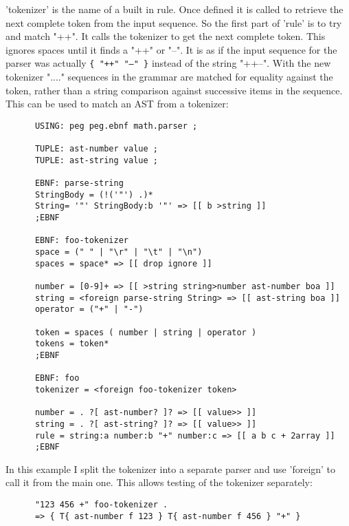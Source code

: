 \begin{itemize}
      'tokenizer' is the name of a built in rule. Once defined it is
      called to retrieve the next complete token from the input
      sequence. So the first part of 'rule' is to try and match
      "++". It calls the tokenizer to get the next complete
      token. This ignores spaces until it finds a "++" or "--". It is
      as if the input sequence for the parser was actually 
      \texttt{\{ "++" "--" \}} instead of the string "++--". With the new tokenizer "...."
      sequences in the grammar are matched for equality against the
      token, rather than a string comparison against successive items
      in the sequence. This can be used to match an AST from a
      tokenizer:
\begin{verbatim}
      USING: peg peg.ebnf math.parser ;

      TUPLE: ast-number value ;
      TUPLE: ast-string value ;

      EBNF: parse-string
      StringBody = (!('"') .)* 
      String= '"' StringBody:b '"' => [[ b >string ]]
      ;EBNF

      EBNF: foo-tokenizer
      space = (" " | "\r" | "\t" | "\n")
      spaces = space* => [[ drop ignore ]]

      number = [0-9]+ => [[ >string string>number ast-number boa ]]
      string = <foreign parse-string String> => [[ ast-string boa ]]
      operator = ("+" | "-")

      token = spaces ( number | string | operator )
      tokens = token*
      ;EBNF

      EBNF: foo
      tokenizer = <foreign foo-tokenizer token>

      number = . ?[ ast-number? ]? => [[ value>> ]]
      string = . ?[ ast-string? ]? => [[ value>> ]]
      rule = string:a number:b "+" number:c => [[ a b c + 2array ]]
      ;EBNF
\end{verbatim}

      In this example I split the tokenizer into a separate parser and
 use 'foreign' to call it from the main one. This allows testing of
 the tokenizer separately:
\begin{verbatim}
      "123 456 +" foo-tokenizer .
      => { T{ ast-number f 123 } T{ ast-number f 456 } "+" }
\end{verbatim}


\end{itemize}
